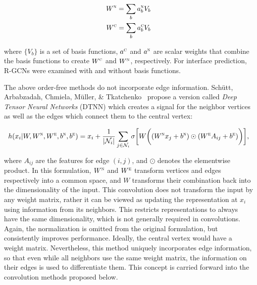 \begin{equation}
\begin{split}
W^\textsc{n} = \sum_{b} a^\textsc{n}_b V_b \\
W^\textsc{c} = \sum_{b} a^\textsc{c}_b V_b 
\end{split}
\label{eq:rgcn_basis}
\end{equation}

\noindent
where $\{V_b\}$ is a set of basis functions, $a^\textsc{c}$ and $a^\textsc{n}$ are scalar weights that combine the basis functions to create $W^\textsc{c}$ and $W^\textsc{n}$, respectively.
For interface prediction, R-GCNs were examined with and without basis functions.

The above order-free methods do not incorporate edge information.
Sch{\"u}tt, Arbabzadah, Chmiela, M{\"u}ller, \& Tkatchenko~\cite{schutt2017} propose a version called \emph{Deep Tensor Neural Networks} (DTNN) which creates a signal for the neighbor vertices as well as the edges which connect them to the central vertex:

\begin{equation}
h(x_i | W, W^\textsc{n}, W^\textsc{e}, b^\textsc{n}, b^\textsc{e})= x_i + \frac{1}{|\mathcal{N}_i|} \sum_{j \in \mathcal{N}_i} \sigma \bigg[ W \bigg( (W^\textsc{n} x_j + b^\textsc{n}) \odot (W^\textsc{e} A_{ij} + b^\textsc{e}) \bigg) \bigg],
\label{eq:deep_tensor}
\end{equation}

\noindent
where $A_{ij}$ are the features for edge $(i, j)$, and $\odot$ denotes the elementwise product.
In this formulation, $W^\textsc{n}$ and $W^\textsc{e}$ transform vertices and edges respectively into a common space, and $W$ transforms their combination back into the dimensionality of the input. 
This convolution does not transform the input by any weight matrix, rather it can be viewed as updating the representation at $x_i$ using information from its neighbors.
This restricts representations to always have the same dimensionality, which is not generally required in convolutions. 
Again, the normalization is omitted from the original formulation, but consistently improves performance.
Ideally, the central vertex would have a weight matrix.
Nevertheless, this method uniquely incorporates edge information, so that even while all neighbors use the same weight matrix, the information on their edges is used to differentiate them.
This concept is carried forward into the convolution methods proposed below.


